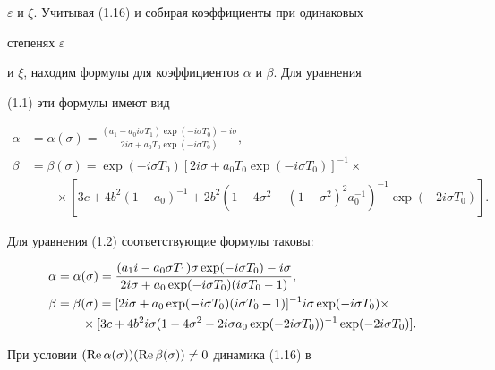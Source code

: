 $\varepsilon$ и $\xi$. Учитывая (1.16) и собирая коэффициенты при одинаковых


степенях $\varepsilon$


и $\xi$, находим формулы для коэффициентов $\alpha$ и $\beta$. Для уравнения


(1.1) эти формулы имеют вид


\begin{align*}


\alpha &= \alpha(\sigma) =


\frac{(a_1-a_0i\sigma T_1)\exp(-i\sigma T_0)-i\sigma}


{2i\sigma+a_0 T_0\exp(-i\sigma T_0)}, \\


%


\beta &= \beta(\sigma) =


\exp(-i\sigma T_0)[ 2i\sigma+a_0 T_0\exp(-i\sigma T_0)]^{-1}\times \\


&\qquad\times [3c+4b^2(1-a_0)^{-1}+2b^2(1-4\sigma^2-


(1-\sigma^2)^2a_0^{-1})^{-1} \exp(-2i\sigma T_0)].


\end{align*}


Для уравнения (1.2) соответствующие формулы таковы:


\begin{align}


\alpha &= \alpha(\sigma) = \frac


{(a_1i-a_0\sigma T_1)\sigma\exp(-i\sigma T_0)-i\sigma}


{ 2i\sigma+a_0\exp(-i\sigma T_0)


(i\sigma T_0 - 1)}, \\


%


\beta &= \beta(\sigma) = [ 2i\sigma+a_0\exp(-i\sigma T_0)


(i\sigma T_0 - 1)]^{-1} i\sigma\exp(-i\sigma T_0)\times\notag \\


%


&\qquad\times


[3c+4b^2i\sigma(1-4\sigma^2-2i\sigma a_0\exp(-2i\sigma T_0))^{-1}


\exp(-2i\sigma T_0)].


\end{align}


При условии $(\operatorname{Re}\alpha(\sigma))(\operatorname{Re}\beta(\sigma))\neq0$ динамика (1.16) в


